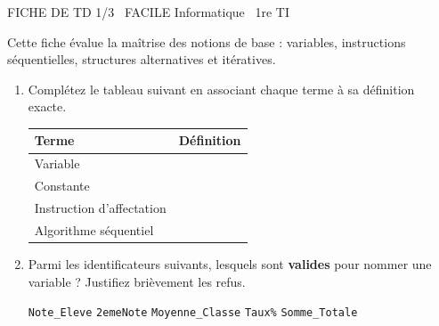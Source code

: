 \documentclass[11pt]{article}
\begin{document}
\begin{tcolorbox}[enhanced,colback=popink,colframe=popink,arc=10pt,boxrule=0pt,left=12pt,right=12pt,top=9pt,bottom=9pt]
{\color{white}\popxbold\small FICHE DE TD 1/3 \textbullet\ FACILE \hfill Informatique \textbullet\ 1re TI\par}
\end{tcolorbox}
\vspace{4pt}
Cette fiche évalue la maîtrise des notions de base : variables, instructions séquentielles, structures alternatives et itératives.

\begin{exercice}
\begin{enumerate}
    \item Complétez le tableau suivant en associant chaque terme à sa définition exacte.
    \begin{tabular}{|p{3.5cm}|p{11cm}|}
    \hline
    \textbf{Terme} & \textbf{Définition} \\ \hline
    Variable & \\ \hline
    Constante & \\ \hline
    Instruction d'affectation & \\ \hline
    Algorithme séquentiel & \\ \hline
    \end{tabular}
    \item Parmi les identificateurs suivants, lesquels sont \textbf{valides} pour nommer une variable ? Justifiez brièvement les refus.
    \begin{center}
    \texttt{Note\_Eleve} \quad \texttt{2emeNote} \quad \texttt{Moyenne\_Classe} \quad \texttt{Taux\%} \quad \texttt{Somme\_Totale}
    \end{center}
\end{enumerate}
\end{exercice}
\end{document}
